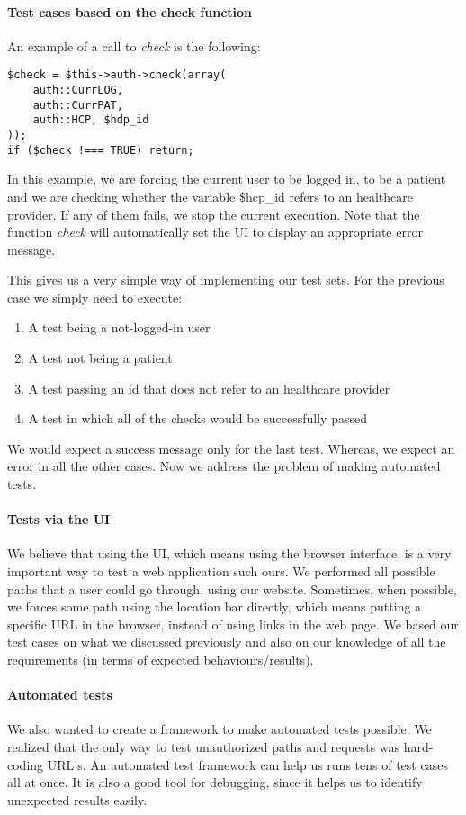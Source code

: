 \paragraph{Test cases based on the check function}
An example of a call to \emph{check} is the following:
\begin{verbatim}
$check = $this->auth->check(array(
    auth::CurrLOG,
    auth::CurrPAT,
    auth::HCP, $hdp_id
));
if ($check !=== TRUE) return;
\end{verbatim}

In this example, we are forcing the current user to be logged in, to be a patient and we are checking whether the variable \$hcp\_id refers to an healthcare provider. If any of them fails, we stop the current execution. Note that the function \emph{check} will automatically set the UI to display an appropriate error message.

This gives us a very simple way of implementing our test sets. For the previous case we simply need to execute:
\begin{enumerate}
\item A test being a not-logged-in user
\item A test not being a patient
\item A test passing an id that does not refer to an healthcare provider
\item A test in which all of the checks would be successfully passed
\end{enumerate}
We would expect a success message only for the last test. Whereas, we expect an error in all the other cases. Now we address the problem of making automated tests.

\paragraph{Tests via the UI}
We believe that using the UI, which means using the browser interface, is a very important way to test a web application such ours. We performed all possible paths that a user could go through, using our website. Sometimes, when possible, we forces some path using the location bar directly, which means putting a specific URL in the browser, instead of using links in the web page. We based our test cases on what we discussed previously and also on our knowledge of all the requirements (in terms of expected behaviours/results).

\paragraph{Automated tests}
We also wanted to create a framework to make automated tests possible. We realized that the only way to test unauthorized paths and requests was hard-coding URL's. An automated test framework can help us runs tens of test cases all at once. It is also a good tool for debugging, since it helps us to identify unexpected results easily.

